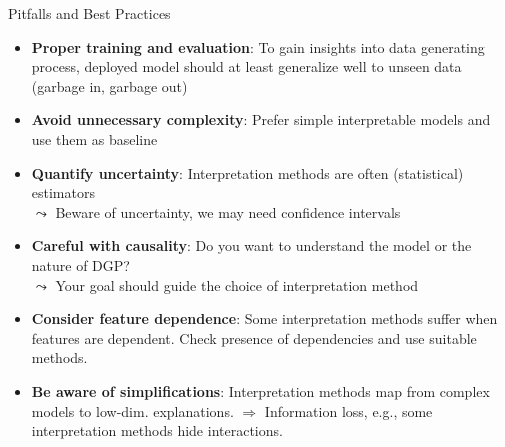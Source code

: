 \documentclass[11pt,compress,t,notes=noshow, aspectratio=169, xcolor=table]{beamer}
\begin{document}

\begin{frame}[t]{Pitfalls and Best Practices }
\begin{itemize}
    \item \textbf{Proper training and evaluation}: 
    To gain insights into data generating process, deployed model should at least generalize well to unseen data (garbage in, garbage out)
    \item \textbf{Avoid unnecessary complexity}: Prefer simple interpretable models and use them as baseline
    \item \textbf{Quantify uncertainty}: Interpretation methods are often (statistical) estimators \\
    $\leadsto$ Beware of uncertainty, we may need confidence intervals
    \item \textbf{Careful with causality}: 
     Do you want to understand the model or the nature of DGP?\\
     $\leadsto$ Your goal should guide the choice of interpretation method
    \item \textbf{Consider feature dependence}: Some interpretation methods suffer when features are dependent. Check presence of dependencies and use suitable methods.
    \item \textbf{Be aware of simplifications}: Interpretation methods map from complex models to low-dim. explanations. $\Rightarrow$ Information loss, e.g., some interpretation methods hide interactions.
\end{itemize}

\end{frame}

\endlecture
\end{document}

